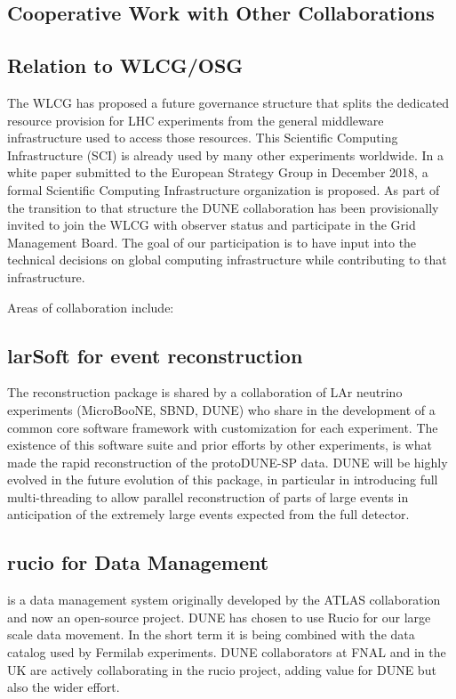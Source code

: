 \subsection{Cooperative Work with Other Collaborations	}
\label{ch:exec-comp-gov-coop}

\subsection{Relation to WLCG/OSG}
The WLCG has proposed a future governance structure that splits the dedicated resource provision for LHC experiments from the general middleware infrastructure used to access those resources.  This Scientific Computing Infrastructure (SCI) is already used by many other experiments worldwide.  In a white paper submitted to the European Strategy Group in December 2018, a formal Scientific Computing Infrastructure organization is proposed. As part of the transition to that structure the DUNE collaboration has been provisionally invited to join the WLCG with observer status and participate in the Grid Management Board. The goal of our participation is to have input into the technical decisions on global computing infrastructure while contributing to that infrastructure. 

Areas of collaboration include:

\subsection{larSoft for event reconstruction}

The   reconstruction package is shared by a collaboration of LAr neutrino experiments (MicroBooNE, SBND, DUNE) who share in the development of a common core software framework with customization for each experiment. The existence of this software suite and prior efforts by other experiments,  is what made the rapid reconstruction of the protoDUNE-SP data.  DUNE will be highly evolved in the future evolution of this package, in particular in introducing full multi-threading to allow parallel reconstruction of parts of large events in anticipation of the extremely large events expected from the full detector.  

\subsection{rucio for Data Management}  
\cite{Barisits:2019fyl}
is a data management system originally developed by the ATLAS collaboration and now an open-source project.  DUNE has chosen to use Rucio for our large scale data movement.  In the short term it is being combined with the  data catalog used by Fermilab experiments.  DUNE collaborators at FNAL and in the UK are actively collaborating in the rucio project, adding value for DUNE but also the wider effort.




